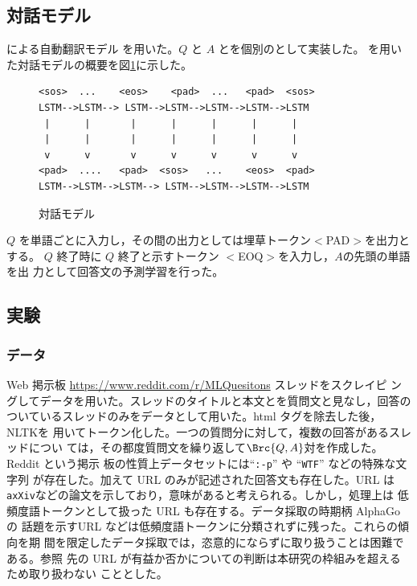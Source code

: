 \documentclass[twocolumn]{jarticle}
\begin{document}
\subsection{対話モデル}%
\cite{2014Sutskever_Sequence_to_Sequence}による自動翻訳モデル
を用いた。$Q$ と $A$ とを個別の\LSTM として実装した。
\LSTM を用いた対話モデルの概要を図\ref{fig:discours}に示した。
\begin{figure}[H]
\begin{verbatim}
<sos>  ...    <eos>    <pad>  ...   <pad>  <sos>
LSTM-->LSTM--> LSTM-->LSTM-->LSTM-->LSTM-->LSTM 
 |      |       |      |      |      |      |   
 |      |       |      |      |      |      |  
 v      v       v      v      v      v      v  
<pad>  ....   <pad>  <sos>   ...    <eos>  <pad>
LSTM-->LSTM-->LSTM--> LSTM-->LSTM-->LSTM-->LSTM
\end{verbatim}
\caption{対話モデル}\label{fig:discours}
\end{figure}
$Q$ を単語ごとに入力し，その間の出力としては埋草トークン$<$PAD$>$を出力とする。
$Q$ 終了時に $Q$ 終了と示すトークン $<$EOQ$>$を入力し，$A$の先頭の単語を出
力として回答文の予測学習を行った。

\subsection{実験}
\subsubsection{データ}

Web 掲示板 \url{https://www.reddit.com/r/MLQuesitons} スレッドをスクレイピ
ングしてデータを用いた。スレッドのタイトルと本文とを質問文と見なし，回答の
ついているスレッドのみをデータとして用いた。html タグを除去した後，{NLTK}を
用いてトークン化した。一つの質問分に対して，複数の回答があるスレッドについ
ては，その都度質問文を繰り返して$\Brc{Q,A}$対を作成した。Reddit という掲示
板の性質上データセットには``{\tt :-p}'' や ``{\tt WTF}'' などの特殊な文字列
が存在した。加えて URL のみが記述された回答文も存在した。URL は {\tt
 ax{X}iv}などの論文を示しており，意味があると考えられる。しかし，処理上は
低頻度語トークンとして扱った URL も存在する。データ採取の時期柄 AlphaGo の
話題を示すURL などは低頻度語トークンに分類されずに残った。これらの傾向を期
間を限定したデータ採取では，恣意的にならずに取り扱うことは困難である。参照
先の URL が有益か否かについての判断は本研究の枠組みを超えるため取り扱わない
こととした。
\end{document}
